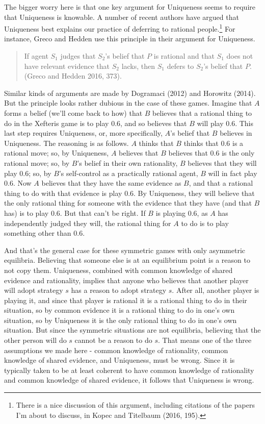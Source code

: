 \documentclass[
  11pt,
]{article}
\begin{document}
The bigger worry here is that one key argument for Uniqueness seems to require that Uniqueness is knowable. A number of recent authors have argued that Uniqueness best explains our practice of deferring to rational people.\footnote{There is a nice discussion of this argument, including citations of the papers I'm about to discuss, in Kopec and Titelbaum (2016, 195).} For instance, Greco and Hedden use this principle in their argument for Uniqueness.

\begin{quote}
If agent \(S_1\) judges that \(S_2\)'s belief that \(P\) is rational and that \(S_1\) does not have relevant evidence that \(S_2\) lacks, then \(S_1\) defers to \(S_2\)'s belief that \(P\). (Greco and Hedden 2016, 373).
\end{quote}

Similar kinds of arguments are made by Dogramaci (2012) and Horowitz (2014). But the principle looks rather dubious in the case of these games. Imagine that \(A\) forms a belief (we'll come back to how) that \(B\) believes that a rational thing to do in the Xefteris game is to play 0.6, and so believes that \(B\) will play 0.6. This last step requires Uniqueness, or, more specifically, \(A\)'s belief that \(B\) believes in Uniqueness. The reasoning is as follows. \(A\) thinks that \(B\) thinks that 0.6 is a rational move; so, by Uniqueness, \(A\) believes that \(B\) believes that 0.6 is the only rational move; so, by \(B\)'s belief in their own rationality, \(B\) believes that they will play 0.6; so, by \(B\)'s self-control as a practically rational agent, \(B\) will in fact play 0.6. Now \(A\) believes that they have the same evidence as \(B\), and that a rational thing to do with that evidence is play 0.6. By Uniqueness, they will believe that the only rational thing for someone with the evidence that they have (and that \(B\) has) is to play 0.6. But that can't be right. If \(B\) is playing 0.6, as \(A\) has independently judged they will, the rational thing for \(A\) to do is to play something other than 0.6.

And that's the general case for these symmetric games with only asymmetric equilibria. Believing that someone else is at an equilibrium point is a reason to not copy them. Uniqueness, combined with common knowledge of shared evidence and rationality, implies that anyone who believes that another player will adopt strategy \(s\) has a reason to adopt strategy \(s\). After all, another player is playing it, and since that player is rational it is a rational thing to do in their situation, so by common evidence it is a rational thing to do in one's own situation, so by Uniqueness it is the only rational thing to do in one's own situation. But since the symmetric situations are not equilibria, believing that the other person will do \(s\) cannot be a reason to do \(s\). That means one of the three assumptions we made here - common knowledge of rationality, common knowledge of shared evidence, and Uniqueness, must be wrong. Since it is typically taken to be at least coherent to have common knowledge of rationality and common knowledge of shared evidence, it follows that Uniqueness is wrong.
\end{document}
